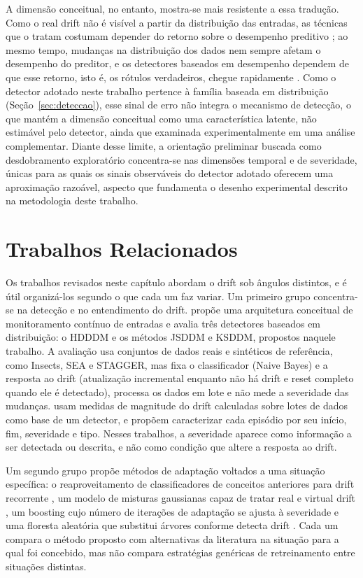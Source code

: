 A dimensão conceitual, no entanto, mostra-se mais resistente a essa tradução.
Como o real drift não é visível a partir da distribuição das entradas,
as técnicas que o tratam costumam depender do retorno sobre o desempenho
preditivo \cite{gama2014}; ao mesmo tempo, mudanças na distribuição dos dados
nem sempre afetam o desempenho do preditor, e os detectores baseados em
desempenho dependem de que esse retorno, isto é, os rótulos verdadeiros,
chegue rapidamente \cite{bayram2022}. Como o detector adotado neste
trabalho pertence à família baseada em distribuição (Seção~\ref{sec:deteccao}),
esse sinal de erro não integra o mecanismo de detecção, o que mantém a
dimensão conceitual como uma característica latente, não estimável pelo
detector, ainda que examinada experimentalmente em uma análise
complementar. Diante desse limite, a orientação preliminar buscada como
desdobramento exploratório concentra-se nas dimensões temporal e de
severidade, únicas para as quais os sinais observáveis do detector adotado
oferecem uma aproximação razoável, aspecto que fundamenta o desenho
experimental descrito na metodologia deste trabalho.
\section{Trabalhos Relacionados}
\label{sec:relacionados}
Os trabalhos revisados neste capítulo abordam o drift sob ângulos distintos,
e é útil organizá-los segundo o que cada um faz variar. Um primeiro grupo
concentra-se na detecção e no entendimento do drift.
 propõe uma arquitetura conceitual de monitoramento
contínuo de entradas e avalia três detectores baseados em distribuição: o
HDDDM e os métodos JSDDM e KSDDM, propostos naquele trabalho. A avaliação
usa conjuntos de dados reais e sintéticos de referência, como Insects, SEA e
STAGGER, mas fixa o classificador (Naive Bayes) e a resposta ao drift
(atualização incremental enquanto não há drift e reset completo quando ele é
detectado), processa os dados em lote e não mede a severidade das mudanças.
 usam medidas de magnitude do drift calculadas
sobre lotes de dados como base de um detector, e
 propõem caracterizar cada episódio por seu
início, fim, severidade e tipo. Nesses trabalhos, a severidade aparece como
informação a ser detectada ou descrita, e não como condição que altere a
resposta ao drift.

Um segundo grupo propõe métodos de adaptação voltados a uma situação
específica: o reaproveitamento de classificadores de conceitos anteriores
para drift recorrente \cite{sun2018,li2021}, um modelo de misturas
gaussianas capaz de tratar real e virtual drift \cite{oliveira2023}, um
boosting cujo número de iterações de adaptação se ajusta à severidade
\cite{wang2022elastic} e uma floresta aleatória que substitui árvores
conforme detecta drift \cite{gomes2017arf}. Cada um compara o método
proposto com alternativas da literatura na situação para a qual foi
concebido, mas não compara estratégias genéricas de retreinamento entre
situações distintas.

